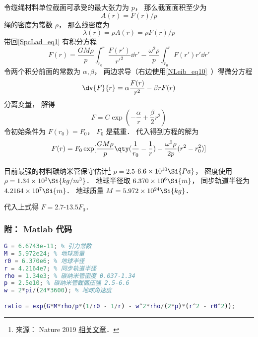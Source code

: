令缆绳材料单位截面可承受的最大张力为 $p$， 那么截面面积至少为
\begin{equation}
A(r) = F(r)/p
\end{equation}
绳的密度为常数 $\rho$， 那么线密度为
\begin{equation}
\lambda(r) = \rho A(r) = \rho F(r)/p
\end{equation}
带回\autoref{SpcLad_eq1} 有积分方程
\begin{equation}
F(r) = \frac{GM\rho}{p} \int_{r_0}^{r} \frac{F(r')}{r'^2} \dd{r'} - \frac{\omega^2\rho}{p}\int_{r_0}^r F(r') r' \dd{r'}
\end{equation}
令两个积分前面的常数为 $\alpha, \beta$， 两边求导（右边使用\autoref{NLeib_eq10}~）得微分方程
\begin{equation}
\dv{F}{r} = \alpha \frac{F(r)}{r^2} - \beta r F(r)
\end{equation}
分离变量， 解得
\begin{equation}
F = C\exp(-\frac{\alpha}{r} + \frac{\beta}{2} r^2)
\end{equation}
令初始条件为 $F(r_0) = F_0$， $F_0$ 是载重． 代入得到方程的解为
\begin{equation}
F(r) = F_0 \exp[\frac{GM\rho}{p} \qty(\frac{1}{r_0} - \frac{1}{r}) - \frac{\omega^2\rho}{2p}(r^2 - r_0^2)]
\end{equation}

目前最强的材料碳纳米管保守估计\footnote{来源： Nature 2019 \href{https://www.nature.com/articles/s41467-019-10959-7}{相关文章}．} $p = 2.5$-$6.6\times 10^{10} \Si{Pa}$， 密度使用 $\rho = 1.34\times 10^{3} \Si{kg/m^3}$． 地球半径取 $6.370\times 10^6\Si{m}$， 同步轨道半径为 $4.2164\times 10^7 \Si{m}$． 地球质量 $M = 5.972 \times 10^{24} \Si{kg}$．

代入上式得 $F = 2.7$-$13.5 F_0$．

\subsubsection{附： Matlab 代码}
\begin{lstlisting}[language=matlab]
G = 6.6743e-11; % 引力常数
M = 5.972e24; % 地球质量
r0 = 6.370e6; % 地球半径
r = 4.2164e7; % 同步轨道半径
rho = 1.34e3; % 碳纳米管密度 0.037-1.34
p = 2.5e10; % 碳纳米管截面压强 2.5-6.6
w = 2*pi/(24*3600); % 地球角速度

ratio = exp(G*M*rho/p*(1/r0 - 1/r) - w^2*rho/(2*p)*(r^2 - r0^2));
\end{lstlisting}

